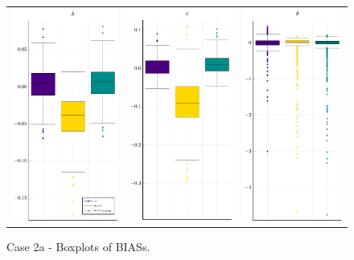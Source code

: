 \begin{figure}[ht]
	\centering
	\begin{tabular}[b]{c c c}
		\includegraphics[width=.3\textwidth]{Figures/2a/BIAS_b.pdf} & \includegraphics[width=.3\textwidth]{Figures/2a/BIAS_a.pdf} & \includegraphics[width=.3\textwidth]{Figures/2a/BIAS_t.pdf}
	\end{tabular}
	\caption{Case 2a - Boxplots of BIASs.}
	\label{fig:bpBIAS2a}
\end{figure}
